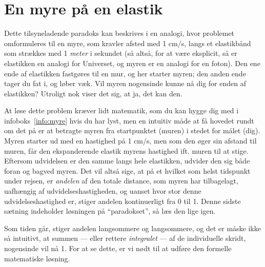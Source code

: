 \documentclass[useAMS,danish]{aa}
\begin{document}
\section{En myre på en elastik}
\label{sec:myre}

Dette tilsyneladende paradoks kan beskrives i en analogi, hvor problemet omformuleres til en myre, som kravler afsted med 1 cm/s, langs et elastikbånd som strækkes med 1 \emph{meter} i sekundet (så altså, for at være eksplicit, så er elastikken en analogi for Universet, og myren er en analogi for en foton).
Den ene ende af elastikken fastgøres til en mur, og her starter myren; den anden ende tager du fat i, og løber væk.
Vil myren nogensinde kunne nå dig for enden af elastikken?
Utroligt nok viser det sig, at ja, det kan den.

At løse dette problem kræver lidt matematik, som du kan hygge dig med i infoboks~\ref{info:myre} hvis du har lyst, men en intuitiv måde at få hovedet rundt om det på er at betragte myren fra startpunktet (muren) i stedet for målet (dig).
Myren starter ud med en hastighed på 1 cm/s, men som den øger sin afstand til muren, får den ekspanderende elastik myrens hastighed ift. muren til at stige.
Eftersom udvidelsen er den samme langs hele elastikken, udvider den sig både foran og bagved myren.
Det vil altså sige, at på et hvilket som helst tidspunkt under rejsen, er \emph{andelen} af den totale distance, som myren har tilbagelagt, uafhængig af udvidelseshastigheden, og uanset hvor stor denne udvidelseshastighed er, stiger andelen kontinuerligt fra 0 til 1.
Denne sidste sætning indeholder løsningen på ``paradokset'', så læs den lige igen.

Som tiden går, stiger andelen langsommere og langsommere, og det er måske ikke så intuitivt, at summen --- eller rettere \emph{integralet} --- af de individuelle skridt, nogensinde vil nå 1.
For at se dette, er vi nødt til at udføre den formelle matematiske løsning.
\end{document}
